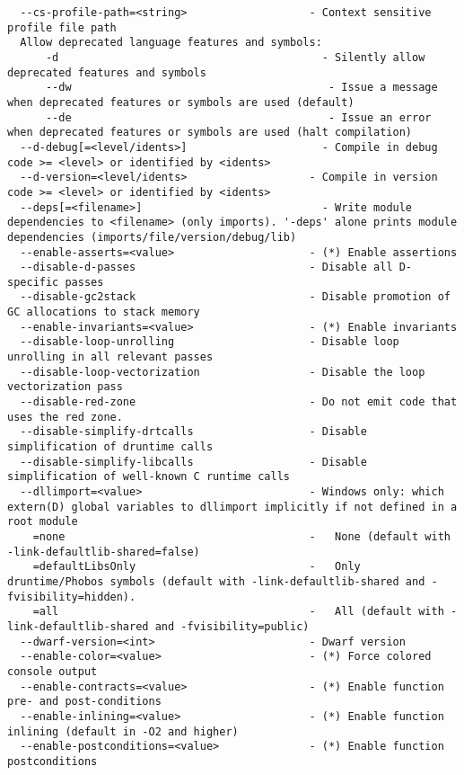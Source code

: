 \documentclass[732]{studrep}
\begin{document}
\begin{verbatim}
  --cs-profile-path=<string>                   - Context sensitive profile file path
  Allow deprecated language features and symbols:
      -d                                         - Silently allow deprecated features and symbols
      --dw                                        - Issue a message when deprecated features or symbols are used (default)
      --de                                        - Issue an error when deprecated features or symbols are used (halt compilation)
  --d-debug[=<level/idents>]                     - Compile in debug code >= <level> or identified by <idents>
  --d-version=<level/idents>                   - Compile in version code >= <level> or identified by <idents>
  --deps[=<filename>]                            - Write module dependencies to <filename> (only imports). '-deps' alone prints module dependencies (imports/file/version/debug/lib)
  --enable-asserts=<value>                     - (*) Enable assertions
  --disable-d-passes                           - Disable all D-specific passes
  --disable-gc2stack                           - Disable promotion of GC allocations to stack memory
  --enable-invariants=<value>                  - (*) Enable invariants
  --disable-loop-unrolling                     - Disable loop unrolling in all relevant passes
  --disable-loop-vectorization                 - Disable the loop vectorization pass
  --disable-red-zone                           - Do not emit code that uses the red zone.
  --disable-simplify-drtcalls                  - Disable simplification of druntime calls
  --disable-simplify-libcalls                  - Disable simplification of well-known C runtime calls
  --dllimport=<value>                          - Windows only: which extern(D) global variables to dllimport implicitly if not defined in a root module
    =none                                      -   None (default with -link-defaultlib-shared=false)
    =defaultLibsOnly                           -   Only druntime/Phobos symbols (default with -link-defaultlib-shared and -fvisibility=hidden).
    =all                                       -   All (default with -link-defaultlib-shared and -fvisibility=public)
  --dwarf-version=<int>                        - Dwarf version
  --enable-color=<value>                       - (*) Force colored console output
  --enable-contracts=<value>                   - (*) Enable function pre- and post-conditions
  --enable-inlining=<value>                    - (*) Enable function inlining (default in -O2 and higher)
  --enable-postconditions=<value>              - (*) Enable function postconditions

\end{verbatim}
\end{document}
